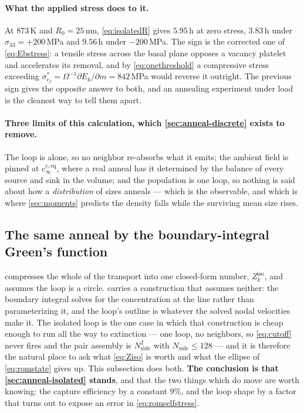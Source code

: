 \documentclass{article}
\begin{document}
\paragraph{What the applied stress does to it.} At $873\,$K and $R_0=25\,$nm,
\cref{eq:isolatedR} gives $5.95\,$h at zero stress, $3.83\,$h under
$\sigma_{33}=+200\,$MPa and $9.56\,$h under $-200\,$MPa. The sign is the
corrected one of \cref{eq:Ebstress}: a tensile stress across the basal plane
opposes a vacancy platelet and accelerates its removal, and by
\cref{eq:onethreshold} a compressive stress exceeding
$\sigma^\ast_{c_f}=\Omega^{-1}\partial E_k/\partial m=842\,$MPa would reverse it
outright. The previous sign gives the opposite answer to both, and an annealing
experiment under load is the cleanest way to tell them apart.

\paragraph{Three limits of this calculation, which \cref{sec:anneal-discrete}
exists to remove.} The loop is alone, so no neighbor re-absorbs what it emits;
the ambient field is pinned at $c^{v,\mathrm{eq}}_\infty$, where a real anneal
has it determined by the balance of every source and sink in the volume; and the
population is one loop, so nothing is said about how a \emph{distribution} of
sizes anneals --- which is the observable, and which is where \cref{sec:moments}
predicts the density falls while the surviving mean size rises.

\subsection{The same anneal by the boundary-integral Green's function}
\label{sec:anneal-greens}

 compresses the whole of the transport into one closed-form
number, $Z^{\mathrm{iso}}_k$, and assumes the loop is a circle. 
carries a construction that assumes neither: the boundary integral solves for the
concentration at the line rather than parameterizing it, and the loop's outline is
whatever the solved nodal velocities make it. The isolated loop is the one case
in which that construction is cheap enough to run all the way to extinction ---
one loop, no neighbors, so \cref{eq:cutoff} never fires and the pair assembly is
$N_{\mathrm{side}}^2$ with $N_{\mathrm{side}}\le128$ --- and it is therefore the
natural place to ask what \cref{eq:Ziso} is worth and what the ellipse of
\cref{eq:romstate} gives up. This subsection does both. \textbf{The conclusion is
that \cref{sec:anneal-isolated} stands}, and that the two things which do move
are worth knowing: the capture efficiency by a constant $9\%$, and the loop shape
by a factor that turns out to expose an error in \cref{eq:romselfstress}.
\end{document}
